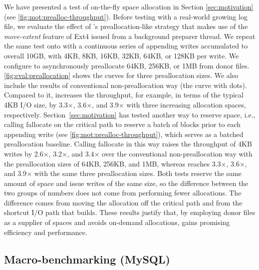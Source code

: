 We have presented a test of on-the-fly space allocation in Section \ref{sec:motivation}  (see \autoref{fig:mot:prealloc-throughput}).
Before testing with a real-world   growing log file, we evaluate the effect of \odes's preallocation-like strategy that makes use of the {\em move-extent} feature of Ext4 issued from a background preparer thread.
We repeat the same test onto \odes with a continuous  series of appending writes accumulated to overall 10GB, with 4KB, 8KB, 16KB, 32KB, 64KB, or 128KB
per write. We configure \odes to 
asynchronously preallocate 64KB, 256KB, or 1MB from donor files.
\autoref{fig:eval:preallocation} shows the curves for three  preallocation sizes. We also include the results of conventional non-preallocation way
(the curve with dots).
Compared to it,
\odes increases  the throughput, for example, in terms of the typical 4KB I/O size,  by 3.3$\times$, 3.6$\times$, and 3.9$\times$ 
with three  increasing allocation spaces, respectively.
Section~\ref{sec:motivation} has tested another way to reserve space, i.e.,
calling fallocate on the critical path to reserve a batch of blocks prior to each
appending write (see \autoref{fig:mot:prealloc-throughput}), which serves as a
batched preallocation baseline. Calling fallocate in this way raises the throughput
of 4KB writes by 2.6$\times$, 3.2$\times$, and 3.4$\times$ over the conventional
non-preallocation way with the preallocation sizes of 64KB, 256KB, and 1MB, whereas
\odes reaches 3.3$\times$, 3.6$\times$, and 3.9$\times$ with the same three
preallocation sizes.
Both tests reserve the same amount of space and issue writes of the same size, so
the difference between the two groups of numbers does not come from performing
fewer allocations. The difference comes from moving the allocation off the critical
path and from the shortcut I/O path that \odes builds.
These results justify that,
by employing donor files as a supplier of spaces and avoids on-demand allocations,
\odes
gains promising efficiency and  performance.
	
	

\subsection{Macro-benchmarking (MySQL)}\label{sec:eval:mysql}

 

